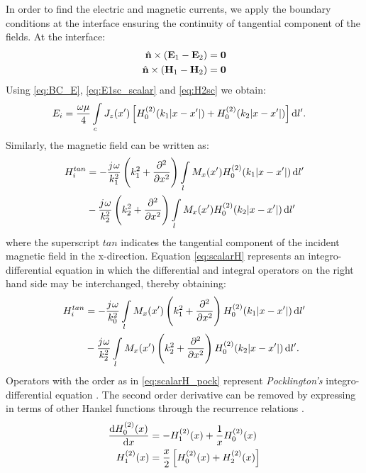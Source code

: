 \documentclass[12pt]{article}
\begin{document}
In order to find the electric and magnetic currents, we apply the boundary conditions at the interface ensuring the continuity of tangential component of the fields. At the interface:
%
\begin{subequations}
  \begin{align}
    \hat{\mathbf{n}} \times (\mathbf{E}_1 - \mathbf{E}_2) ={}& \mathbf{0}
    \label{eq:BC_E}\\
    \hat{\mathbf{n}} \times (\mathbf{H}_1 - \mathbf{H}_2) ={}& \mathbf{0}
    \label{eq:BC_H}
  \end{align}
  \label{eq:BC}%
\end{subequations}%
%
Using \eqref{eq:BC_E}, \eqref{eq:E1sc_scalar} and \eqref{eq:H2sc} we obtain:
%
\begin{align}
  E_i &= \frac{\omega \mu}{4} \int\limits_c J_z(x') \left[ H_0^{(2)}(k_1 |x - x'|) + H_0^{(2)}(k_2 |x - x'|)\right] \mathop{}\!\mathrm{d}{l'}.
  \label{eq:scalarE}
\end{align}
%
Similarly, the magnetic field can be written as:
%
\begin{align}
  H_i^{tan} &=  -\frac{{j}\mkern1mu \omega}{k_1^2}\left(k_1^2 +  \pdv[2]{}{x} \right) \int\limits_{l} M_x(x') H_0^{(2)}(k_1 |x - x'|) \mathop{}\!\mathrm{d}{l'} \notag\\
  & - \frac{{j}\mkern1mu \omega}{k_2^2}\left(k_2^2 +  \pdv[2]{}{x} \right) \int\limits_{l} M_x(x') H_0^{(2)}(k_2 |x - x'|) \mathop{}\!\mathrm{d}{l'}
  \label{eq:scalarH}
\end{align}
%
where the superscript $tan$ indicates the tangential component of the incident magnetic field in the x-direction. Equation \eqref{eq:scalarH} represents an integro-differential equation in which the differential and integral operators on the right hand side may be interchanged, thereby obtaining:
%
\begin{align}
  H_i^{tan} &=  -\frac{{j}\mkern1mu \omega}{k_0^2} \int\limits_{l} M_x(x') \left(k_1^2 +  \pdv[2]{}{x} \right) H_0^{(2)}(k_1 |x - x'|) \mathop{}\!\mathrm{d}{l'} \notag\\
  & - \frac{{j}\mkern1mu \omega}{k_2^2} \int\limits_{l} M_x(x') \left(k_2^2 +  \pdv[2]{}{x} \right) H_0^{(2)}(k_2 |x - x'|) \mathop{}\!\mathrm{d}{l'}.
  \label{eq:scalarH_pock}
\end{align}
%
Operators with the order as in \eqref{eq:scalarH_pock} represent \emph{Pocklington's} integro-differential equation \cite{Stutzman2012}. The second order derivative can be removed by expressing in terms of other Hankel functions through the recurrence relations \cite[p. 361]{Abramowitz2012}.
%
\begin{subequations}
  \begin{align}
    \dv{H_0^{(2)}(x)}{x} &= -H_{1}^{(2)}(x) + \frac{1}{x} H_0^{(2)}(x)
    \label{eq:Hankel_ID1}\\
    H_{1}^{(2)}(x)  &= \frac{x}{2} \left[H_{0}^{(2)}(x) + H_{2}^{(2)}(x)\right]
    \label{eq:Hankel_ID2}
  \end{align}
  \label{eq:Hankel_ID}%
\end{subequations}%
\end{document}
